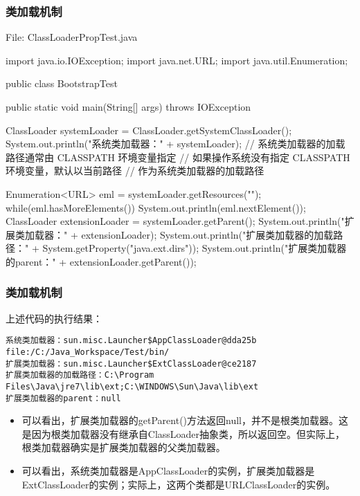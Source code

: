 \begin{frame}[fragile] %
\frametitle{类加载机制}

File: ClassLoaderPropTest.java

\begin{javaCode}
import java.io.IOException;
import java.net.URL;
import java.util.Enumeration;

public class BootstrapTest {
  public static void main(String[] args) throws IOException {
    ClassLoader systemLoader = ClassLoader.getSystemClassLoader();
    System.out.println("系统类加载器：" + systemLoader);
    // 系统类加载器的加载路径通常由 CLASSPATH 环境变量指定
    // 如果操作系统没有指定 CLASSPATH 环境变量，默认以当前路径
    // 作为系统类加载器的加载路径  

    Enumeration<URL> eml = systemLoader.getResources(""); 
    while(eml.hasMoreElements()) {
      System.out.println(eml.nextElement());
    }
    ClassLoader extensionLoader = systemLoader.getParent();
    System.out.println("扩展类加载器：" + extensionLoader);
    System.out.println("扩展类加载器的加载路径：" + System.getProperty("java.ext.dirs"));
    System.out.println("扩展类加载器的parent：" + extensionLoader.getParent());
  }
}
\end{javaCode}
\end{frame}

\begin{frame}[fragile] %
\frametitle{类加载机制}
上述代码的执行结果：
{\footnotesize
\begin{verbatim}
系统类加载器：sun.misc.Launcher$AppClassLoader@dda25b
file:/C:/Java_Workspace/Test/bin/
扩展类加载器：sun.misc.Launcher$ExtClassLoader@ce2187
扩展类加载器的加载路径：C:\Program Files\Java\jre7\lib\ext;C:\WINDOWS\Sun\Java\lib\ext
扩展类加载器的parent：null
\end{verbatim}}
\begin{itemize}
\item {\Red\kai 可以看出，扩展类加载器的getParent()方法返回null，并不是根类加载器。这是因为根类加载器没有继承自ClassLoader抽象类，所以返回空。但实际上，根类加载器确实是扩展类加载器的父类加载器。}
\item 可以看出，系统类加载器是AppClassLoader的实例，扩展类加载器是ExtClassLoader的实例；实际上，这两个类都是URLClassLoader的实例。
\end{itemize}
\end{frame}

